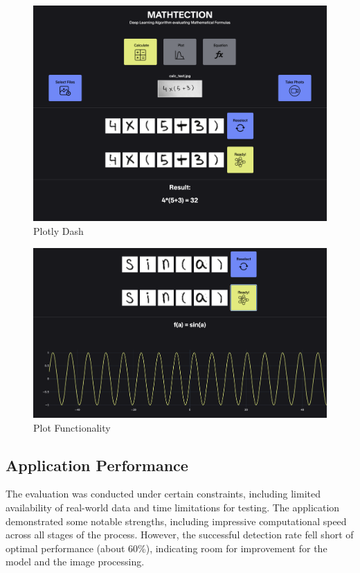 \documentclass[@CLASSOPTIONS@]{tumarticle}
\begin{document}
\begin{figure}
    \begin{minipage}{0.48\textwidth}
     \centering
     \includegraphics[width=.9\linewidth]{figures/dash}
     \caption{Plotly Dash}\label{Fig:Dash}
   \end{minipage}
\end{figure}
\begin{figure}
    \begin{minipage}{0.48\textwidth}
     \centering
     \includegraphics[width=.9\linewidth]{figures/dash3}
     \caption{Plot Functionality}\label{Fig:Dash2}
   \end{minipage}
\end{figure}

\subsection{Application Performance}

The evaluation was conducted under certain constraints,
including limited availability of real-world data and time limitations for testing.
The application demonstrated some notable strengths, including impressive computational
speed across all stages of the process.
However, the successful detection rate fell short of optimal performance (about 60\%), indicating room
for improvement for the model and the image processing.
\end{document}
